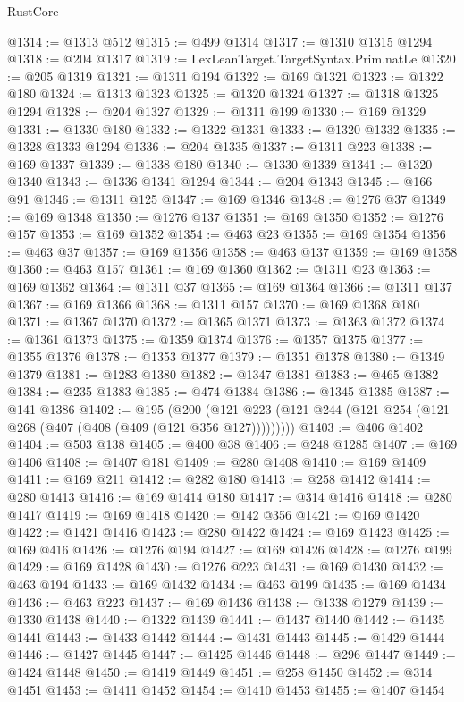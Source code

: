 \begin{lexlean}{RustCore}
\begin{coremodule}
@1314 := @1313 @512
@1315 := @499 @1314
@1317 := @1310 @1315 @1294
@1318 := @204 @1317
@1319 := LexLeanTarget.TargetSyntax.Prim.natLe
@1320 := @205 @1319
@1321 := @1311 @194
@1322 := @169 @1321
@1323 := @1322 @180
@1324 := @1313 @1323
@1325 := @1320 @1324
@1327 := @1318 @1325 @1294
@1328 := @204 @1327
@1329 := @1311 @199
@1330 := @169 @1329
@1331 := @1330 @180
@1332 := @1322 @1331
@1333 := @1320 @1332
@1335 := @1328 @1333 @1294
@1336 := @204 @1335
@1337 := @1311 @223
@1338 := @169 @1337
@1339 := @1338 @180
@1340 := @1330 @1339
@1341 := @1320 @1340
@1343 := @1336 @1341 @1294
@1344 := @204 @1343
@1345 := @166 @91
@1346 := @1311 @125
@1347 := @169 @1346
@1348 := @1276 @37
@1349 := @169 @1348
@1350 := @1276 @137
@1351 := @169 @1350
@1352 := @1276 @157
@1353 := @169 @1352
@1354 := @463 @23
@1355 := @169 @1354
@1356 := @463 @37
@1357 := @169 @1356
@1358 := @463 @137
@1359 := @169 @1358
@1360 := @463 @157
@1361 := @169 @1360
@1362 := @1311 @23
@1363 := @169 @1362
@1364 := @1311 @37
@1365 := @169 @1364
@1366 := @1311 @137
@1367 := @169 @1366
@1368 := @1311 @157
@1370 := @169 @1368 @180
@1371 := @1367 @1370
@1372 := @1365 @1371
@1373 := @1363 @1372
@1374 := @1361 @1373
@1375 := @1359 @1374
@1376 := @1357 @1375
@1377 := @1355 @1376
@1378 := @1353 @1377
@1379 := @1351 @1378
@1380 := @1349 @1379
@1381 := @1283 @1380
@1382 := @1347 @1381
@1383 := @465 @1382
@1384 := @235 @1383
@1385 := @474 @1384
@1386 := @1345 @1385
@1387 := @141 @1386
@1402 := @195
    (@200 (@121 @223 (@121 @244 (@121 @254 (@121 @268 (@407 (@408 (@409 (@121 @356 @127)))))))))
@1403 := @406 @1402
@1404 := @503 @138
@1405 := @400 @38
@1406 := @248 @1285
@1407 := @169 @1406
@1408 := @1407 @181
@1409 := @280 @1408
@1410 := @169 @1409
@1411 := @169 @211
@1412 := @282 @180
@1413 := @258 @1412
@1414 := @280 @1413
@1416 := @169 @1414 @180
@1417 := @314 @1416
@1418 := @280 @1417
@1419 := @169 @1418
@1420 := @142 @356
@1421 := @169 @1420
@1422 := @1421 @1416
@1423 := @280 @1422
@1424 := @169 @1423
@1425 := @169 @416
@1426 := @1276 @194
@1427 := @169 @1426
@1428 := @1276 @199
@1429 := @169 @1428
@1430 := @1276 @223
@1431 := @169 @1430
@1432 := @463 @194
@1433 := @169 @1432
@1434 := @463 @199
@1435 := @169 @1434
@1436 := @463 @223
@1437 := @169 @1436
@1438 := @1338 @1279
@1439 := @1330 @1438
@1440 := @1322 @1439
@1441 := @1437 @1440
@1442 := @1435 @1441
@1443 := @1433 @1442
@1444 := @1431 @1443
@1445 := @1429 @1444
@1446 := @1427 @1445
@1447 := @1425 @1446
@1448 := @296 @1447
@1449 := @1424 @1448
@1450 := @1419 @1449
@1451 := @258 @1450
@1452 := @314 @1451
@1453 := @1411 @1452
@1454 := @1410 @1453
@1455 := @1407 @1454

\end{coremodule}
\end{lexlean}
